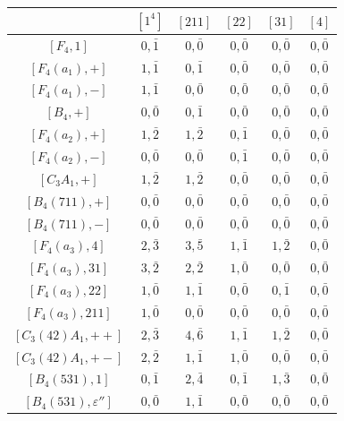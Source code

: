 \begin{landscape}
\begin{table}[h]
        \begin{minipage}{0.4\textwidth}
            \centering
            \begin{tabular}{|c|ccccc|}
                \hline
                & $[1^4]$ & $[211]$ & $[22]$ & $[31]$ & $[4]$ \\\hline
                $[F_4,1]$ & $0,\bar1$ & $0,\bar0$ & $0,\bar0$ & $0,\bar0$ & $0,\bar0$ \\\hline
                $[F_4(a_1),+]$ & $1,\bar1$ & $0,\bar1$ & $0,\bar0$ & $0,\bar0$ & $0,\bar0$ \\
                $[F_4(a_1),-]$ & $1,\bar1$ & $0,\bar0$ & $0,\bar0$ & $0,\bar0$ & $0,\bar0$ \\
                $[B_4,+]$ & $0,\bar0$ & $0,\bar1$ & $0,\bar0$ & $0,\bar0$ & $0,\bar0$ \\\hline
                $[F_4(a_2),+]$ & $1,\bar2$ & $1,\bar2$ & $0,\bar1$ & $0,\bar0$ & $0,\bar0$ \\
                $[F_4(a_2),-]$ & $0,\bar0$ & $0,\bar0$ & $0,\bar1$ & $0,\bar0$ & $0,\bar0$ \\
                $[C_3A_1,+]$ & $1,\bar2$ & $1,\bar2$ & $0,\bar0$ & $0,\bar0$ & $0,\bar0$ \\\hline
                $[B_4(711),+]$ & $0,\bar0$ & $0,\bar0$ & $0,\bar0$ & $0,\bar0$ & $0,\bar0$ \\
                $[B_4(711),-]$ & $0,\bar0$ & $0,\bar0$ & $0,\bar0$ & $0,\bar0$ & $0,\bar0$ \\\hline
                $[F_4(a_3),4]$ & $2,\bar{3}$ & $3,\bar{5}$ & $1,\bar1$ & $1,\bar2$ & $0,\bar0$ \\
                $[F_4(a_3),31]$ & $3,\bar2$ & $2,\bar2$ & $1,\bar0$ & $0,\bar0$ & $0,\bar0$ \\
                $[F_4(a_3),22]$ & $1,\bar0$ & $1,\bar1$ & $0,\bar0$ & $0,\bar1$ & $0,\bar0$ \\
                $[F_4(a_3),211]$ & $1,\bar0$ & $0,\bar0$ & $0,\bar0$ & $0,\bar0$ & $0,\bar0$ \\
                $[C_3(42)A_1,++]$ & $2,\bar{3}$ & $4,\bar{6}$ & $1,\bar1$ & $1,\bar2$ & $0,\bar0$ \\
                $[C_3(42)A_1,+-]$ & $2,\bar2$ & $1,\bar1$ & $1,\bar0$ & $0,\bar0$ & $0,\bar0$ \\
                $[B_4(531),1]$ & $0,\bar1$ & $2,\bar{4}$ & $0,\bar1$ & $1,\bar{3}$ & $0,\bar0$ \\
                $[B_4(531),\varepsilon'']$ & $0,\bar0$ & $1,\bar1$ & $0,\bar0$ & $0,\bar0$ & $0,\bar0$ \\

\end{tabular}
\end{minipage}
\end{table}
\end{landscape}

